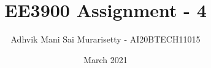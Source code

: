 \documentclass[journal,12pt,twocolumn]{IEEEtran}
\date{March 2021}
\DeclareMathOperator*{\Res}{Res}
\begin{document}
\newcommand{\BEQA}{\begin{eqnarray}}
\newcommand{\EEQA}{\end{eqnarray}}
\newcommand{\define}{\stackrel{\triangle}{=}}

\raggedbottom
\setlength{\parindent}{0pt}
\providecommand{\mbf}{\mathbf}
\providecommand{\pr}[1]{\ensuremath{\Pr\left(#1\right)}}
\providecommand{\qfunc}[1]{\ensuremath{Q\left(#1\right)}}
\providecommand{\fn}[1]{\ensuremath{f\left({#1}\right)}}
\providecommand{\e}[1]{\ensuremath{E\left(#1\right)}}
\providecommand{\sbrak}[1]{\ensuremath{{}\left[#1\right]}}
\providecommand{\lsbrak}[1]{\ensuremath{{}\left[#1\right.}}
\providecommand{\rsbrak}[1]{\ensuremath{{}\left.#1\right]}}
\providecommand{\brak}[1]{\ensuremath{\left(#1\right)}}
\providecommand{\lbrak}[1]{\ensuremath{\left(#1\right.}}
\providecommand{\rbrak}[1]{\ensuremath{\left.#1\right)}}
\providecommand{\cbrak}[1]{\ensuremath{\left\{#1\right\}}}
\providecommand{\lcbrak}[1]{\ensuremath{\left\{#1\right.}}
\providecommand{\rcbrak}[1]{\ensuremath{\left.#1\right\}}}
\theoremstyle{remark}
\newtheorem{rem}{Remark}
\newcommand{\sgn}{\mathop{\mathrm{sgn}}}
\newcommand{\comb}[2]{{}^{#1}\mathrm{C}_{#2}}
\providecommand{\abs}[1]{\vert#1\vert}
\providecommand{\res}[1]{\Res\displaylimits_{#1}} 
\providecommand{\norm}[1]{\lVert#1\rVert}
\providecommand{\mtx}[1]{\mathbf{#1}}
\providecommand{\mean}[1]{E\sbrak{ #1 }}
\providecommand{\fourier}{\overset{\mathcal{F}}{ \rightleftharpoons}}
\providecommand{\system}{\overset{\mathcal{H}}{ \longleftrightarrow}}
\newcommand{\solution}{\noindent \textbf{Solution: }}
\newcommand{\cosec}{\,\text{cosec}\,}
\providecommand{\dec}[2]{\ensuremath{\overset{#1}{\underset{#2}{\gtrless}}}}
\newcommand{\myvec}[1]{\ensuremath{\begin{pmatrix}#1\end{pmatrix}}}
\newcommand{\mydet}[1]{\ensuremath{\begin{vmatrix}#1\end{vmatrix}}}
\makeatletter
{}
\makeatother
\let\StandardTheFigure\thefigure
\let\vec\mathbf
\vspace{3cm}
\title{EE3900 Assignment - 4}
\author{Adhvik Mani Sai Murarisetty - AI20BTECH11015}
\maketitle
\newpage
\bigskip
\renewcommand{\thetable}{\theenumi}
\end{document}
